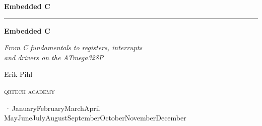 %
\providecommand{\bookversion}{}
\newcommand{\bookdate}{\number\day\space\ifcase\month\or January\or February\or March\or April\or
  May\or June\or July\or August\or September\or October\or November\or December\fi\space
  \number\year}
\newcommand{\bookedition}{\ifx\bookversion\empty\else\bookversion\,·\,\fi\bookdate}

\thispagestyle{empty}
\vspace*{2.2in}
\begin{flushright}
  {\Large\bfseries Embedded C}
\end{flushright}
\cleardoublepage

\thispagestyle{empty}
\vspace*{1.1in}
\begin{flushleft}
  {\color{accent}\rule{0.9in}{2.5pt}}\par\vspace{1.4ex}
  {\fontsize{32}{38}\selectfont\bfseries Embedded C\par}
  \vspace{2.2ex}
  {\Large\itshape From C fundamentals to registers, interrupts\\and drivers on the ATmega328P\par}
  \vspace{1.2in}
  {\large Erik Pihl\par}
  \vfill
  {\small\scshape\lsstyle qrtech academy\par}
  \vspace{0.6ex}
  {\small\color{muted} \bookedition\par}
\end{flushleft}
\newpage

